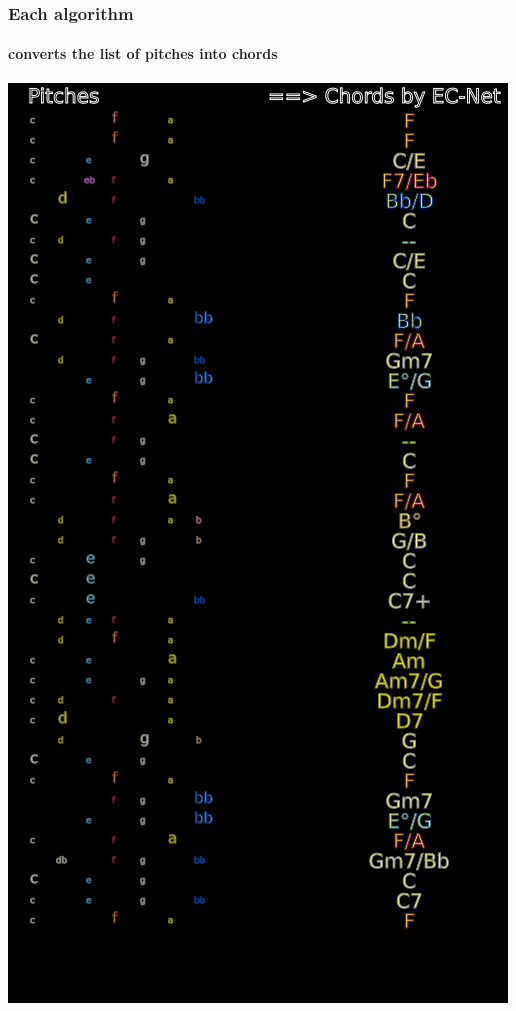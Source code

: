 \documentclass{beamer}
\begin{document}
\begin{frame}
  \frametitle{Each algorithm}
  \framesubtitle{converts the list of pitches into chords}
  \centering
  \includegraphics[scale=0.6, trim = 0em 51em 0em 0em, clip ]{figs/algorithm}
\end{frame}
\end{document}

